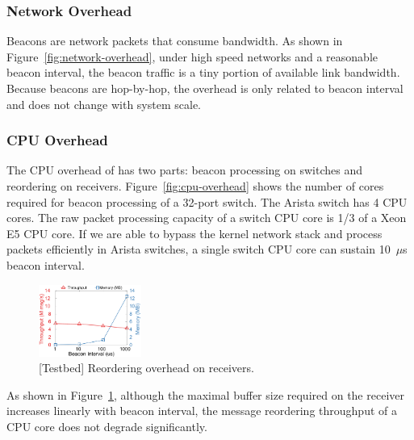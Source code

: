 

\subsubsection{Network Overhead}
\label{sec:eval-overhead}



Beacons are network packets that consume bandwidth.
As shown in Figure~\ref{fig:network-overhead}, under high speed networks and a reasonable beacon interval, the beacon traffic is a tiny portion of available link bandwidth.
Because beacons are hop-by-hop, the overhead is only related to beacon interval and does not change with system scale.

\subsubsection{CPU Overhead}
\label{sec:eval-cpu-overhead}

The CPU overhead of \sys has two parts: beacon processing on switches and reordering on receivers.
Figure~\ref{fig:cpu-overhead} shows the number of cores required for beacon processing of a 32-port switch.
The Arista switch has 4 CPU cores.
The raw packet processing capacity of a switch CPU core is 1/3 of a Xeon E5 CPU core.
If we are able to bypass the kernel network stack and process packets efficiently in Arista switches, a single switch CPU core can sustain 10~$\mu$s beacon interval.


\begin{figure}[t]
\centering
\includegraphics[width=0.3\textwidth]{gnuplot/reorder_receiver.pdf}
\caption{[Testbed] Reordering overhead on receivers.}
\label{fig:reorder-overhead}
\end{figure}

As shown in Figure~\ref{fig:reorder-overhead}, although the maximal buffer size required on the receiver increases linearly with beacon interval, the message reordering throughput of a CPU core does not degrade significantly.

